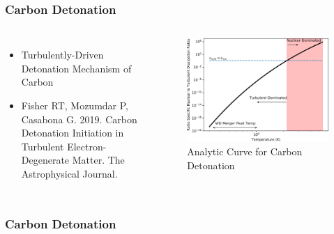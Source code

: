 \documentclass{beamer}
\begin{document}

\begin{frame}
\frametitle{Carbon Detonation}

\begin{columns}[c]
        \begin{itemize}
                \item Turbulently-Driven Detonation Mechanism of Carbon
                \item Fisher RT, Mozumdar P, Casabona G. 2019. Carbon Detonation Initiation in Turbulent Electron-Degenerate Matter. The Astrophysical Journal.
        \end{itemize}


	\vspace{25pt}
        \begin{figure}
    \begin{center}
      \includegraphics[width=.90\linewidth]{carbon_enuc_ration.png}
            \caption{Analytic Curve for Carbon Detonation}
    \end{center}
  \end{figure}

        \end{columns}

\end{frame}


\begin{frame}
\frametitle{Carbon Detonation}

        \begin{figure}
    \begin{center}
    \end{center}
  \end{figure}


\end{frame}
\end{document}
